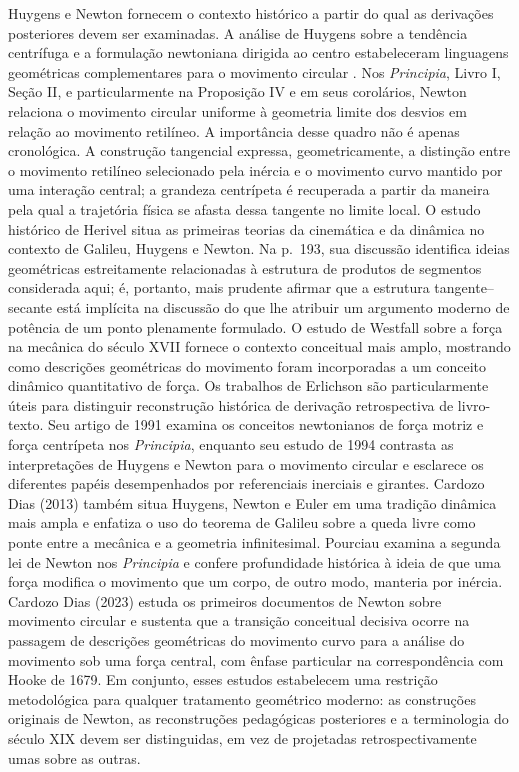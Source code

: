 \documentclass[12pt,a4paper]{article}
\numberwithin{equation}{section}
\theoremstyle{remark}
\begin{document}
Huygens e Newton fornecem o contexto histórico a partir do qual as derivações posteriores devem ser examinadas. A análise de Huygens sobre a tendência centrífuga e a formulação newtoniana dirigida ao centro estabeleceram linguagens geométricas complementares para o movimento circular \cite{huygens1888devi,yoder2013catalogue,newton1729principia}. Nos \textit{Principia}, Livro I, Seção II, e particularmente na Proposição IV e em seus corolários, Newton relaciona o movimento circular uniforme à geometria limite dos desvios em relação ao movimento retilíneo. A importância desse quadro não é apenas cronológica. A construção tangencial expressa, geometricamente, a distinção entre o movimento retilíneo selecionado pela inércia e o movimento curvo mantido por uma interação central; a grandeza centrípeta é recuperada a partir da maneira pela qual a trajetória física se afasta dessa tangente no limite local. O estudo histórico de Herivel \cite{herivel1965background} situa as primeiras teorias da cinemática e da dinâmica no contexto de Galileu, Huygens e Newton. Na p.~193, sua discussão identifica ideias geométricas estreitamente relacionadas à estrutura de produtos de segmentos considerada aqui; é, portanto, mais prudente afirmar que a estrutura tangente--secante está implícita na discussão do que lhe atribuir um argumento moderno de potência de um ponto plenamente formulado. O estudo de Westfall sobre a força na mecânica do século XVII \cite{westfall1971force} fornece o contexto conceitual mais amplo, mostrando como descrições geométricas do movimento foram incorporadas a um conceito dinâmico quantitativo de força. Os trabalhos de Erlichson são particularmente úteis para distinguir reconstrução histórica de derivação retrospectiva de livro-texto. Seu artigo de 1991 \cite{erlichson1991motive} examina os conceitos newtonianos de força motriz e força centrípeta nos \textit{Principia}, enquanto seu estudo de 1994 \cite{erlichson1994huygens} contrasta as interpretações de Huygens e Newton para o movimento circular e esclarece os diferentes papéis desempenhados por referenciais inerciais e girantes. Cardozo Dias (2013) \cite{dias2013dinamica} também situa Huygens, Newton e Euler em uma tradição dinâmica mais ampla e enfatiza o uso do teorema de Galileu sobre a queda livre como ponte entre a mecânica e a geometria infinitesimal. Pourciau \cite{pourciau2019principia} examina a segunda lei de Newton nos \textit{Principia} e confere profundidade histórica à ideia de que uma força modifica o movimento que um corpo, de outro modo, manteria por inércia. Cardozo Dias (2023) \cite{dias2023newton} estuda os primeiros documentos de Newton sobre movimento circular e sustenta que a transição conceitual decisiva ocorre na passagem de descrições geométricas do movimento curvo para a análise do movimento sob uma força central, com ênfase particular na correspondência com Hooke de 1679. Em conjunto, esses estudos estabelecem uma restrição metodológica para qualquer tratamento geométrico moderno: as construções originais de Newton, as reconstruções pedagógicas posteriores e a terminologia do século XIX devem ser distinguidas, em vez de projetadas retrospectivamente umas sobre as outras.
\end{document}
